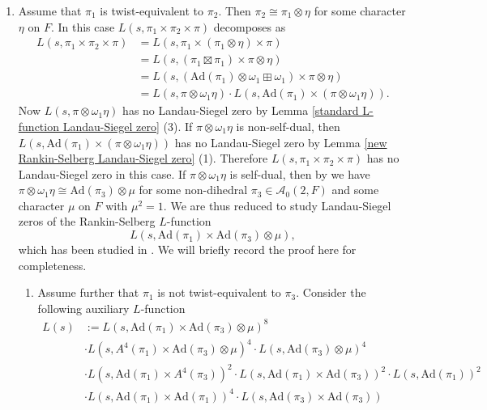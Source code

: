 \documentclass[12pt]{amsart}
\newcommand{\Ad}{\text{Ad}}
\newcommand{\cA}{\mathcal{A}}
\begin{document}
\begin{enumerate}
    \item Assume that $\pi_1$ is twist-equivalent to $\pi_2$. Then $\pi_2 \cong \pi_1 \otimes \eta$ for some character $\eta$ on $F$. In this case $L(s,\pi_1 \times \pi_2 \times \pi)$ decomposes as 
    \begin{align*}
        L(s,\pi_1 \times \pi_2 \times \pi) &= L(s,\pi_1 \times (\pi_1 \otimes \eta) \times \pi) \\
        &= L(s,(\pi_1 \boxtimes \pi_1) \times \pi \otimes \eta) \\
        &= L(s,(\Ad(\pi_1) \otimes \omega_1 \boxplus \omega_1) \times \pi \otimes \eta) \\
        &= L(s,\pi \otimes \omega_1\eta) \cdot L(s,\Ad(\pi_1) \times (\pi \otimes \omega_1\eta)).
    \end{align*}
    Now $L(s,\pi \otimes \omega_1\eta)$ has no Landau-Siegel zero by Lemma \ref{standard L-function Landau-Siegel zero} (3). If $\pi \otimes \omega_1\eta$ is non-self-dual, then $L(s,\Ad(\pi_1) \times (\pi \otimes \omega_1\eta))$ has no Landau-Siegel zero by Lemma \ref{new Rankin-Selberg Landau-Siegel zero} (1). Therefore $L(s,\pi_1 \times \pi_2 \times \pi)$ has no Landau-Siegel zero in this case. If $\pi \otimes \omega_1\eta$ is self-dual, then by \cite[Theorem A]{Ramakrishnan2014} we have $\pi \otimes \omega_1\eta \cong \Ad(\pi_3) \otimes \mu$ for some non-dihedral $\pi_3 \in \cA_0(2,F)$ and some character $\mu$ on $F$ with $\mu^2 = 1$. We are thus reduced to study Landau-Siegel zeros of the Rankin-Selberg $L$-function
    $$L(s,\Ad(\pi_1) \times \Ad(\pi_3) \otimes \mu),$$
    which has been studied in \cite{Thorner2025symmetricsquare}. We will briefly record the proof here for completeness. 
    \begin{enumerate}
        \item Assume further that $\pi_1$ is not twist-equivalent to $\pi_3$. Consider the following auxiliary $L$-function
        \begin{align*}
            L(s) &:= L(s,\Ad(\pi_1) \times \Ad(\pi_3) \otimes \mu)^8 \\
            &\cdot L(s,A^4(\pi_1) \times \Ad(\pi_3) \otimes \mu)^4 \cdot L(s,\Ad(\pi_3) \otimes \mu)^4 \\
            &\cdot L(s,\Ad(\pi_1) \times A^4(\pi_3))^2 \cdot L(s,\Ad(\pi_1) \times \Ad(\pi_3))^2 \cdot L(s,\Ad(\pi_1))^2 \\
            &\cdot L(s,\Ad(\pi_1) \times \Ad(\pi_1))^4 \cdot L(s,\Ad(\pi_3) \times \Ad(\pi_3))\\

\end{align*}
\end{enumerate}
\end{enumerate}
\end{document}
